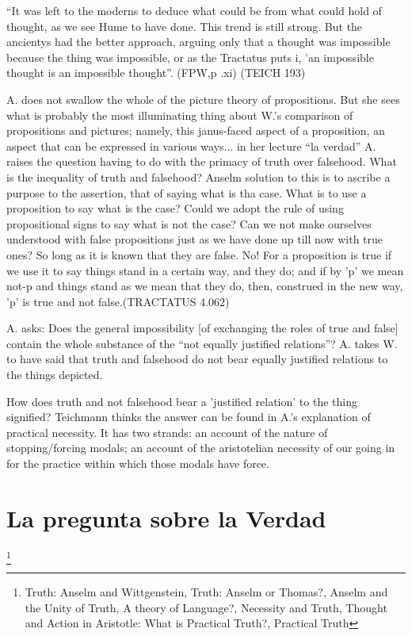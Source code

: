 \documentclass[../main.tex]{subfiles}
\begin{document}
``It was left to the moderns to deduce what could be from what could hold of thought, as we see Hume to have done. This trend is still strong. But the ancientys had the better approach, arguing only that a thought was impossible because the thing was impossible, or as the Tractatus puts i, 'an impossible thought is an impossible thought''. (FPW,p .xi) (TEICH 193)

A. does not swallow the whole of the picture theory of propositions. But she sees what is probably the most illuminating thing about W.'s comparison of propositions and pictures; namely, this janus-faced aspect of a proposition, an aspect that can be expressed in various ways... in her lecture ``la verdad'' A. raises the question having to do with the primacy of truth over falsehood. What is the inequality of truth and falsehood?
Anselm solution to this is to ascribe a purpose to the assertion, that of saying what is tha case. What is to use a proposition to say what is the case? Could we adopt the rule of using propositional signs to say what is not the case?
Can we not make ourselves understood with false propositions just as we have done up till now with true ones? So long as it is known that they are false. No! For a proposition is true if we use it to say things stand in a certain way, and they do; and if by 'p' we mean not-p  and things stand as we mean that they do, then, construed in the new way, 'p' is true and not false.(TRACTATUS 4.062)

A. asks: Does the general impossibility [of exchanging the roles of true and false] contain the whole substance of the ``not equally justified relations''? A. takes W. to have said that truth and falsehood do not bear equally justified relations to the things depicted. 

How does truth and not falsehood bear a 'justified relation' to the thing signified?
Teichmann thinks the answer can be found in A.'s explanation of practical necessity. It has two strands: an account of the nature of stopping/forcing modals; an account of the aristotelian necessity of our going in for the practice within which those modals have force.

\section{La pregunta sobre la Verdad}
\footnote{
Truth: Anselm and Wittgenstein, 
Truth: Anselm or Thomas?, 
Anselm and the Unity of Truth, 
A theory of Language?, 
Necessity and Truth, 
Thought and Action in Aristotle: What is Practical Truth?, 
Practical Truth
}
\end{document}
